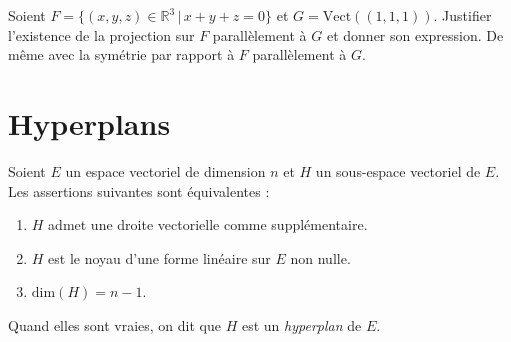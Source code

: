 \documentclass[a4paper,10pt]{report}
\begin{document}
\begin{ApplicationDirecte} Soient $F= \lbrace (x,y,z) \in \mathbb{R}^3 \, \vert \, x+y+z =0 \rbrace$ et $G= \textrm{Vect}((1,1,1))$. Justifier l'existence de la projection sur $F$ parallèlement à $G$ et donner son expression. De même avec la symétrie par rapport à $F$ parallèlement à $G$. \end{ApplicationDirecte}

\section{Hyperplans}

\begin{Theoreme}{} Soient $E$ un espace vectoriel de dimension $n$ et $H$ un sous-espace vectoriel de $E$. Les assertions suivantes sont équivalentes :

\begin{enumerate}
\item $H$ admet une droite vectorielle comme supplémentaire.
\item $H$ est le noyau d'une forme linéaire sur $E$ non nulle.
\item $\textrm{dim}(H)=n-1$.
\end{enumerate}
Quand elles sont vraies, on dit que $H$ est un \emph{hyperplan} de $E$.
\end{Theoreme}
\end{document}
